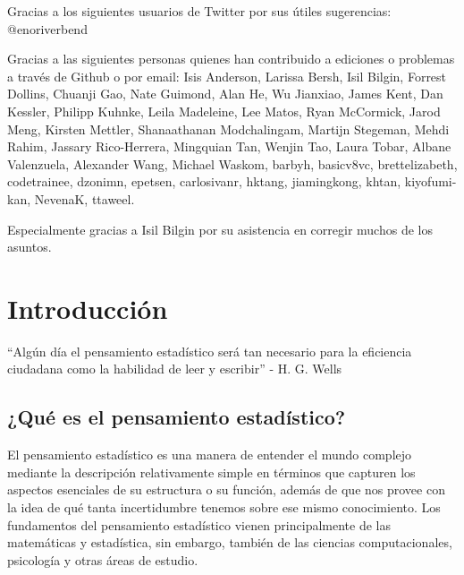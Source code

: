 \documentclass[
  12pt,
]{book}
\begin{document}
Gracias a los siguientes usuarios de Twitter por sus útiles sugerencias: @enoriverbend

Gracias a las siguientes personas quienes han contribuido a ediciones o problemas a través de Github o por email:
Isis Anderson, Larissa Bersh, Isil Bilgin, Forrest Dollins, Chuanji Gao, Nate Guimond, Alan He, Wu Jianxiao, James Kent, Dan Kessler, Philipp Kuhnke, Leila Madeleine, Lee Matos, Ryan McCormick, Jarod Meng, Kirsten Mettler, Shanaathanan Modchalingam, Martijn Stegeman, Mehdi Rahim, Jassary Rico-Herrera, Mingquian Tan, Wenjin Tao, Laura Tobar, Albane Valenzuela, Alexander Wang, Michael Waskom,
barbyh, basicv8vc, brettelizabeth, codetrainee, dzonimn, epetsen, carlosivanr, hktang, jiamingkong, khtan, kiyofumi-kan, NevenaK, ttaweel.

Especialmente gracias a Isil Bilgin por su asistencia en corregir muchos de los asuntos.

\hypertarget{introducciuxf3n}{%
\chapter{Introducción}\label{introducciuxf3n}}

``Algún día el pensamiento estadístico será tan necesario para la eficiencia ciudadana como la habilidad de leer y escribir'' - H. G. Wells

\hypertarget{quuxe9-es-el-pensamiento-estaduxedstico}{%
\section{¿Qué es el pensamiento estadístico?}\label{quuxe9-es-el-pensamiento-estaduxedstico}}

El pensamiento estadístico es una manera de entender el mundo complejo mediante la descripción relativamente simple en términos que capturen los aspectos esenciales de su estructura o su función, además de que nos provee con la idea de qué tanta incertidumbre tenemos sobre ese mismo conocimiento. Los fundamentos del pensamiento estadístico vienen principalmente de las matemáticas y estadística, sin embargo, también de las ciencias computacionales, psicología y otras áreas de estudio.
\end{document}
